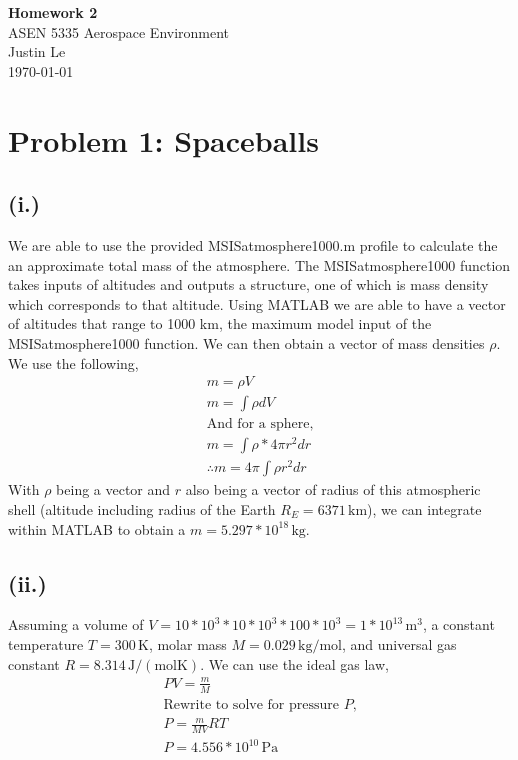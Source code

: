 \documentclass[11pt]{article}
\begin{document}
\begin{center}
    {\Large \textbf{Homework 2}}\\[0.5em]
    {\large ASEN 5335 Aerospace Environment}\\[0.5em]
    Justin Le\\ 
    \today
    \\[0.5em]
\end{center}

\vspace{1em}

\section*{Problem 1: Spaceballs}
\subsection*{(i.)}
\hspace*{2em}We are able to use the provided MSISatmosphere1000.m profile to calculate the
an approximate total mass of the atmosphere. The MSISatmosphere1000 function 
takes inputs of altitudes and outputs a structure, one of which is mass density which
corresponds to that altitude. Using MATLAB we are able to have a vector of altitudes that
range to 1000 km, the maximum model input of the MSISatmosphere1000 function. We can then 
obtain a vector of mass densities $\rho$. We use the following,
\[
\begin{gathered}
m = \rho V \\
m = \int{\rho dV} \\
\text{And for a sphere,} \\
m = \int{\rho*4\pi r^2 dr} \\
\therefore m = 4\pi\int{\rho r^2dr}
\end{gathered}
\]
\hspace*{2em}With $\rho$ being a vector and $r$ also being a vector of radius of this atmospheric
shell (altitude including radius of the Earth $R_E = 6371 \, \mathrm{km}$), we can integrate
within MATLAB to obtain a $\boxed{m=5.297*10^{18}\,\mathrm{kg}}$.
\subsection*{(ii.)}
\hspace*{2em}Assuming a volume of $V = 10*10^3*10*10^3*100*10^3 = 1*10^{13} \, \mathrm{m^3}$, a constant temperature $T = 300 \, \mathrm{K}$, molar mass $M = 0.029 \, \mathrm{kg/mol}$,
and universal gas constant $R = 8.314 \, \mathrm{J/(molK)}$. We can use the ideal gas law,
\[
\begin{gathered}
PV = \frac{m}{M}\\
\text{Rewrite to solve for pressure $P$,} \\
P = \frac{m}{MV}RT \\
\boxed{P = 4.556*10^{10} \, \mathrm{Pa}}
\end{gathered}
\]
\end{document}
